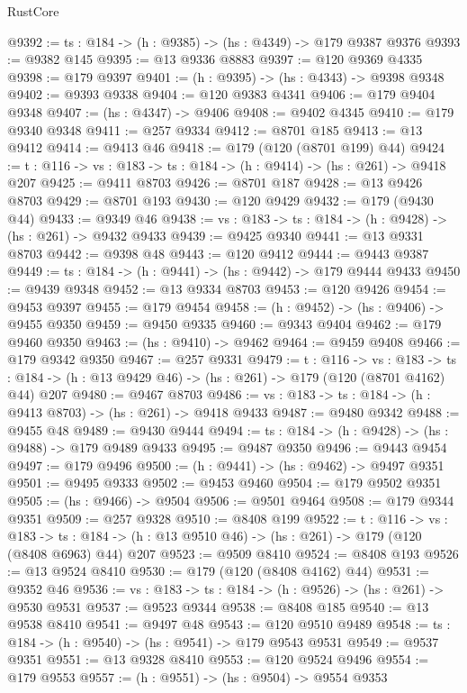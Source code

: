 \begin{lexlean}{RustCore}
\begin{coremodule}
@9392 := {ts : @184} -> (h : @9385) -> (hs : @4349) -> @179 @9387 @9376
@9393 := @9382 @145
@9395 := @13 @9336 @8883
@9397 := @120 @9369 @4335
@9398 := @179 @9397
@9401 := (h : @9395) -> (hs : @4343) -> @9398 @9348
@9402 := @9393 @9338
@9404 := @120 @9383 @4341
@9406 := @179 @9404 @9348
@9407 := (hs : @4347) -> @9406
@9408 := @9402 @4345
@9410 := @179 @9340 @9348
@9411 := @257 @9334
@9412 := @8701 @185
@9413 := @13 @9412
@9414 := @9413 @46
@9418 := @179 (@120 (@8701 @199) @44)
@9424 := {t : @116} -> {vs : @183} -> {ts : @184} -> (h : @9414) -> (hs : @261) -> @9418 @207
@9425 := @9411 @8703
@9426 := @8701 @187
@9428 := @13 @9426 @8703
@9429 := @8701 @193
@9430 := @120 @9429
@9432 := @179 (@9430 @44)
@9433 := @9349 @46
@9438 := {vs : @183} -> {ts : @184} -> (h : @9428) -> (hs : @261) -> @9432 @9433
@9439 := @9425 @9340
@9441 := @13 @9331 @8703
@9442 := @9398 @48
@9443 := @120 @9412
@9444 := @9443 @9387
@9449 := {ts : @184} -> (h : @9441) -> (hs : @9442) -> @179 @9444 @9433
@9450 := @9439 @9348
@9452 := @13 @9334 @8703
@9453 := @120 @9426
@9454 := @9453 @9397
@9455 := @179 @9454
@9458 := (h : @9452) -> (hs : @9406) -> @9455 @9350
@9459 := @9450 @9335
@9460 := @9343 @9404
@9462 := @179 @9460 @9350
@9463 := (hs : @9410) -> @9462
@9464 := @9459 @9408
@9466 := @179 @9342 @9350
@9467 := @257 @9331
@9479 := {t : @116} ->
  {vs : @183} ->
  {ts : @184} -> (h : @13 @9429 @46) -> (hs : @261) -> @179 (@120 (@8701 @4162) @44) @207
@9480 := @9467 @8703
@9486 := {vs : @183} -> {ts : @184} -> (h : @9413 @8703) -> (hs : @261) -> @9418 @9433
@9487 := @9480 @9342
@9488 := @9455 @48
@9489 := @9430 @9444
@9494 := {ts : @184} -> (h : @9428) -> (hs : @9488) -> @179 @9489 @9433
@9495 := @9487 @9350
@9496 := @9443 @9454
@9497 := @179 @9496
@9500 := (h : @9441) -> (hs : @9462) -> @9497 @9351
@9501 := @9495 @9333
@9502 := @9453 @9460
@9504 := @179 @9502 @9351
@9505 := (hs : @9466) -> @9504
@9506 := @9501 @9464
@9508 := @179 @9344 @9351
@9509 := @257 @9328
@9510 := @8408 @199
@9522 := {t : @116} ->
  {vs : @183} ->
  {ts : @184} -> (h : @13 @9510 @46) -> (hs : @261) -> @179 (@120 (@8408 @6963) @44) @207
@9523 := @9509 @8410
@9524 := @8408 @193
@9526 := @13 @9524 @8410
@9530 := @179 (@120 (@8408 @4162) @44)
@9531 := @9352 @46
@9536 := {vs : @183} -> {ts : @184} -> (h : @9526) -> (hs : @261) -> @9530 @9531
@9537 := @9523 @9344
@9538 := @8408 @185
@9540 := @13 @9538 @8410
@9541 := @9497 @48
@9543 := @120 @9510 @9489
@9548 := {ts : @184} -> (h : @9540) -> (hs : @9541) -> @179 @9543 @9531
@9549 := @9537 @9351
@9551 := @13 @9328 @8410
@9553 := @120 @9524 @9496
@9554 := @179 @9553
@9557 := (h : @9551) -> (hs : @9504) -> @9554 @9353

\end{coremodule}
\end{lexlean}
